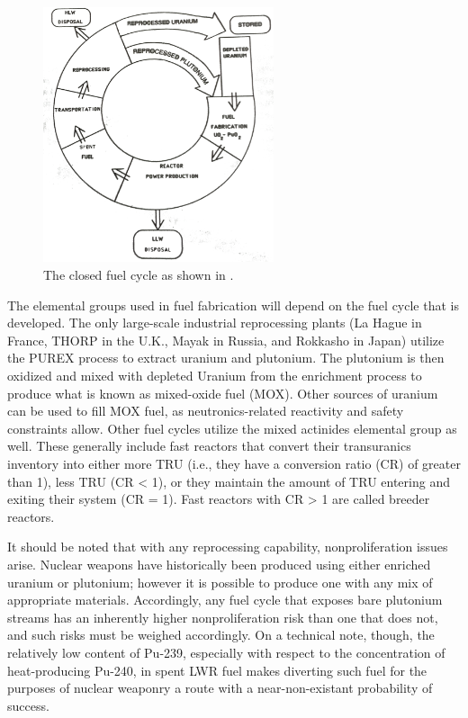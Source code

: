 \begin{figure}[]
  \begin{center}
    \includegraphics[height=7.5cm]{./chapters/intro/closed_cycle.png}
  \caption{The closed fuel cycle as shown in \cite{cochran1990nuclear}.}
  \label{fig:closed-cycle}
  \end{center}
\end{figure}


The elemental groups used in fuel fabrication will depend on the fuel cycle that
is developed. The only large-scale industrial reprocessing plants (La Hague in
France, THORP in the U.K., Mayak in Russia, and Rokkasho in Japan) utilize the
PUREX process to extract uranium and plutonium. The plutonium is then oxidized
and mixed with depleted Uranium from the enrichment process to produce what is
known as mixed-oxide fuel (MOX). Other sources of uranium can be used to fill
MOX fuel, as neutronics-related reactivity and safety constraints allow. Other
fuel cycles utilize the mixed actinides elemental group as well. These generally
include fast reactors that convert their transuranics inventory into either more
TRU (i.e., they have a conversion ratio (CR) of greater than 1), less TRU (CR <
1), or they maintain the amount of TRU entering and exiting their system (CR =
1). Fast reactors with CR > 1 are called breeder reactors.

It should be noted that with any reprocessing capability, nonproliferation
issues arise. Nuclear weapons have historically been produced using either
enriched uranium or plutonium; however it is possible to produce one with any
mix of appropriate materials. Accordingly, any fuel cycle that exposes bare
plutonium streams has an inherently higher nonproliferation risk than one that
does not, and such risks must be weighed accordingly. On a technical note,
though, the relatively low content of Pu-239, especially with respect to the
concentration of heat-producing Pu-240, in spent LWR fuel makes diverting such
fuel for the purposes of nuclear weaponry a route with a near-non-existant
probability of success.

